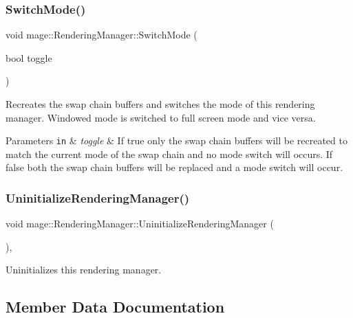 \subsubsection{\texorpdfstring{Switch\+Mode()}{SwitchMode()}}
{\footnotesize\ttfamily void mage\+::\+Rendering\+Manager\+::\+Switch\+Mode (\begin{DoxyParamCaption}\item[{bool}]{toggle }\end{DoxyParamCaption})}

Recreates the swap chain buffers and switches the mode of this rendering manager. Windowed mode is switched to full screen mode and vice versa.


\begin{DoxyParams}[1]{Parameters}
\mbox{\tt in}  & {\em toggle} & If {\ttfamily true} only the swap chain buffers will be recreated to match the current mode of the swap chain and no mode switch will occurs. If {\ttfamily false} both the swap chain buffers will be replaced and a mode switch will occur. \\
\hline
\end{DoxyParams}
\hypertarget{classmage_1_1_rendering_manager_a843980fc7b11d9f72bd89198b60d9473}{}\label{classmage_1_1_rendering_manager_a843980fc7b11d9f72bd89198b60d9473} 
\subsubsection{\texorpdfstring{Uninitialize\+Rendering\+Manager()}{UninitializeRenderingManager()}}
{\footnotesize\ttfamily void mage\+::\+Rendering\+Manager\+::\+Uninitialize\+Rendering\+Manager (\begin{DoxyParamCaption}{ }\end{DoxyParamCaption})\hspace{0.3cm}{\ttfamily [private]}, {\ttfamily [noexcept]}}

Uninitializes this rendering manager. 

\subsection{Member Data Documentation}
\hypertarget{classmage_1_1_rendering_manager_aea09396251f19df13b2f18cba7530851}{}\label{classmage_1_1_rendering_manager_aea09396251f19df13b2f18cba7530851} 
